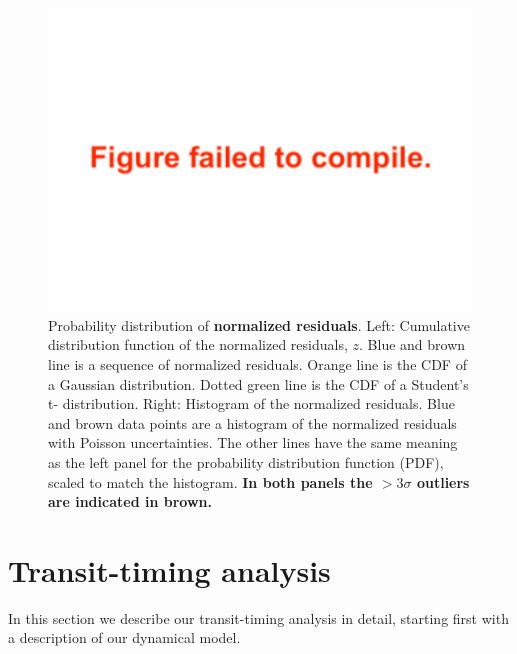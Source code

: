 \documentclass[twocolumn]{aastex63}
\begin{document}
\begin{figure}
    \centering
    \includegraphics[width=\hsize]{figures/Students_t_optimized.pdf}
    {Probability distribution of \textbf{normalized residuals}.  Left:  Cumulative distribution
        function of the normalized residuals, $z$.  Blue and brown line is a sequence of normalized residuals.
        Orange line is the CDF of a Gaussian distribution. %
        Dotted green line is the CDF of a Student's t-
        distribution.  Right: Histogram of the normalized residuals.  Blue and brown data points
        are a histogram of the normalized residuals with Poisson uncertainties.  The other lines
        have the same meaning as the left panel for the probability distribution function
        (PDF),  scaled to match the histogram. \textbf{In both panels the $>3\sigma$ outliers are indicated
        in brown.}}
    \label{fig:timing_residuals}
\end{figure}

\section{Transit-timing analysis} \label{sec:transit_timing}

In this section we describe our transit-timing analysis in detail, starting first with a description of our dynamical model.


\end{document}
